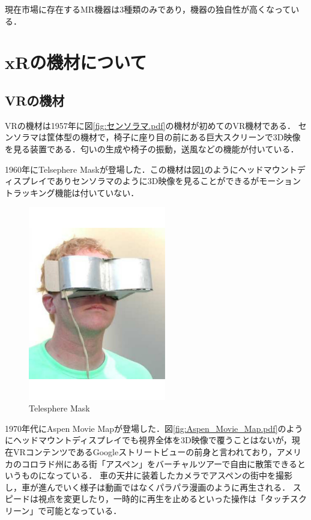 \documentclass[12pt,a4j]{ltjsarticle}
\begin{document}
現在市場に存在するMR機器は3種類のみであり，機器の独自性が高くなっている．

\clearpage
\section{xRの機材について}
\subsection{VRの機材}
VRの機材は1957年に図\ref{fig:センソラマ.pdf}の機材が初めてのVR機材である．
センソラマは筐体型の機材で，椅子に座り目の前にある巨大スクリーンで3D映像を見る装置である．匂いの生成や椅子の振動，送風などの機能が付いている\cite{VRの機材}．

1960年にTelsephere Maskが登場した．この機材は図\ref{fig:Telesphere_Mask.pdf}のようにヘッドマウントディスプレイでありセンソラマのように3D映像を見ることができるがモーショントラッキング機能は付いていない．

\begin{figure}[h]
\begin{center}
 \includegraphics[clip,height=85mm]{Telesphere_Mask.pdf}
\end{center}
 \caption{Telesphere Mask}
 \label{fig:Telesphere_Mask.pdf}
\end{figure}

1970年代にAspen Movie Mapが登場した．図\ref{fig:Aspen_Movie_Map.pdf}のようにヘッドマウントディスプレイでも視界全体を3D映像で覆うことはないが，現在VRコンテンツであるGoogleストリートビューの前身と言われており，アメリカのコロラド州にある街「アスペン」をバーチャルツアーで自由に散策できるというものになっている．
車の天井に装着したカメラでアスペンの街中を撮影し，車が進んでいく様子は動画ではなくパラパラ漫画のように再生される．
スピードは視点を変更したり，一時的に再生を止めるといった操作は「タッチスクリーン」で可能となっている\cite{VRの機材}．
\end{document}
